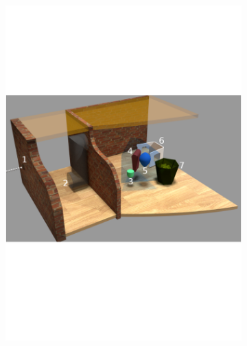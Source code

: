 \documentclass[12pt,a4]{article}
\begin{document}
\begin{figure}[ht!]
    \centering
    \begin{subfigure}{0.3\textwidth}
        \centering
        \includegraphics[width=1\linewidth]{figures/figscene.png}
   

\end{subfigure}
\end{figure}
\end{document}

